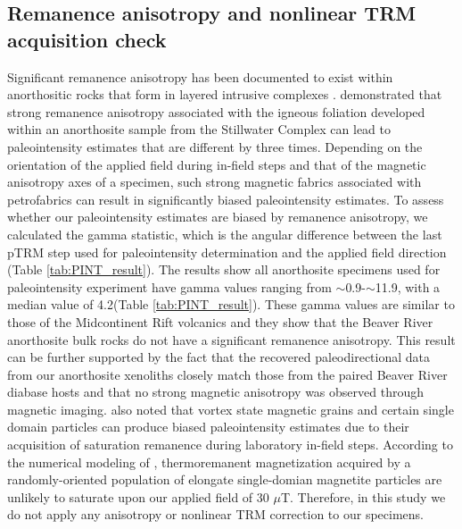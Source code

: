 \documentclass[9pt,twocolumn,twoside,lineno]{pnas-new}
\begin{document}
\subsection*{Remanence anisotropy and nonlinear TRM acquisition check}
Significant remanence anisotropy has been documented to exist within anorthositic rocks that form in layered intrusive complexes \cite{Selkin2000a, Feinberg2006a}. \cite{Selkin2000a} demonstrated that strong remanence anisotropy associated with the igneous foliation developed within an anorthosite sample from the Stillwater Complex can lead to paleointensity estimates that are different by three times. Depending on the orientation of the applied field during in-field steps and that of the magnetic anisotropy axes of a specimen, such strong magnetic fabrics associated with petrofabrics can result in significantly biased paleointensity estimates. To assess whether our paleointensity estimates are biased by remanence anisotropy, we calculated the gamma statistic, which is the angular difference between the last pTRM step used for paleointensity determination and the applied field direction (Table \ref{tab:PINT_result}). The results show all anorthosite specimens used for paleointensity experiment have gamma values ranging from $\sim$0.9\textdegree-$\sim$11.9\textdegree, with a median value of 4.2\textdegree (Table \ref{tab:PINT_result}). These gamma values are similar to those of the Midcontinent Rift volcanics \cite{Sprain2018a} and they show that the Beaver River anorthosite bulk rocks do not have a significant remanence anisotropy. This result can be further supported by the fact that the recovered paleodirectional data from our anorthosite xenoliths closely match those from the paired Beaver River diabase hosts \cite{Zhang2021b} and that no strong magnetic anisotropy was observed through magnetic imaging. \cite{Selkin2007a} also noted that vortex state magnetic grains and certain single domain particles can produce biased paleointensity estimates due to their acquisition of saturation remanence during laboratory in-field steps. According to the numerical modeling of \cite{Selkin2007a}, thermoremanent magnetization acquired by a randomly-oriented population of elongate single-domian magnetite particles are unlikely to saturate upon our applied field of 30 $\mu$T. Therefore, in this study we do not apply any anisotropy or nonlinear TRM correction to our specimens.

\end{document}
